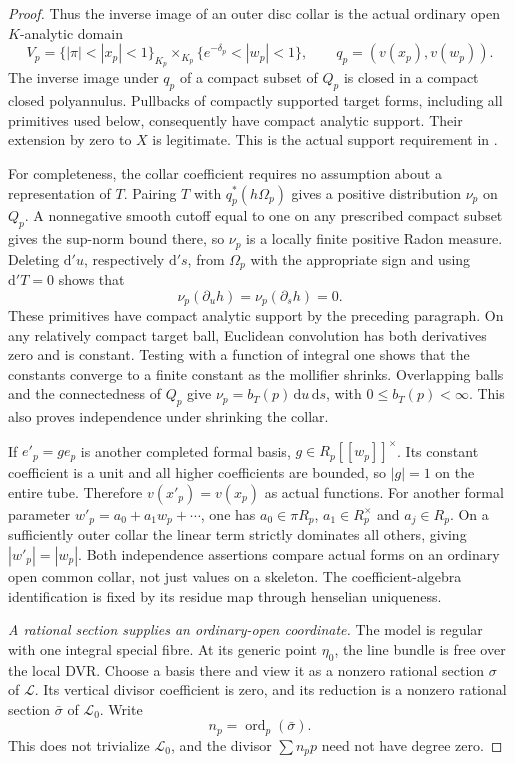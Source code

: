 \begin{proof}
Thus the inverse image of an outer disc collar is the actual
ordinary open \(K\)-analytic domain
\[
 V_p=\{|\pi|<|x_p|<1\}_{K_p}
          \times_{K_p}\{e^{-\delta_p}<|w_p|<1\},
 \qquad q_p=(v(x_p),v(w_p)).
\]
The inverse image under \(q_p\) of a compact subset of \(Q_p\)
is closed in a compact closed polyannulus. Pullbacks of
compactly supported target forms, including all primitives
used below, consequently have compact analytic support.
Their extension by zero to \(X\) is legitimate. This is the
actual support requirement in
\cite[Section 7.1.11, p.~159]{CLD25}.

For completeness, the collar coefficient requires no
assumption about a representation of \(T\). Pairing \(T\)
with \(q_p^*(h\Omega_p)\) gives a positive distribution
\(\nu_p\) on \(Q_p\). A nonnegative smooth cutoff equal to
one on any prescribed compact subset gives the sup-norm
bound there, so \(\nu_p\) is a locally finite positive
Radon measure. Deleting \(\mathrm d'u\), respectively
\(\mathrm d's\), from \(\Omega_p\) with the appropriate
sign and using \(\mathrm d'T=0\) shows that
\[
 \nu_p(\partial_u h)=\nu_p(\partial_s h)=0.
\]
These primitives have compact analytic support by the
preceding paragraph. On any relatively compact target ball,
Euclidean convolution has both derivatives zero and is
constant. Testing with a function of integral one shows
that the constants converge to a finite constant as the
mollifier shrinks. Overlapping balls and the connectedness
of \(Q_p\) give \(\nu_p=b_T(p)\,\mathrm du\,\mathrm ds\),
with \(0\leq b_T(p)<\infty\).
This also proves independence under shrinking the collar.

If \(e'_p=g e_p\) is another completed formal basis,
\(g\in R_p[[w_p]]^\times\). Its constant coefficient is
a unit and all higher coefficients are bounded, so
\(|g|=1\) on the entire tube. Therefore \(v(x'_p)=v(x_p)\)
as actual functions. For another formal parameter
\(w'_p=a_0+a_1w_p+\cdots\), one has
\(a_0\in\pi R_p\), \(a_1\in R_p^\times\) and
\(a_j\in R_p\). On a sufficiently outer collar the linear
term strictly dominates all others, giving
\(|w'_p|=|w_p|\). Both independence assertions compare
actual forms on an ordinary open common collar, not just
values on a skeleton. The coefficient-algebra identification
is fixed by its residue map through henselian uniqueness.

\emph{A rational section supplies an ordinary-open coordinate.}
The model is regular with one integral special fibre. At
its generic point \(\eta_0\), the line bundle is free over
the local DVR. Choose a basis there and view it as a
nonzero rational section \(\sigma\) of \(\mathcal L\).
Its vertical divisor coefficient is zero, and its reduction
is a nonzero rational section \(\bar\sigma\) of
\(\mathcal L_0\). Write
\[
 n_p=\operatorname{ord}_p(\bar\sigma).
\]
This does not trivialize \(\mathcal L_0\), and the divisor
\(\sum n_pp\) need not have degree zero.


\end{proof}
